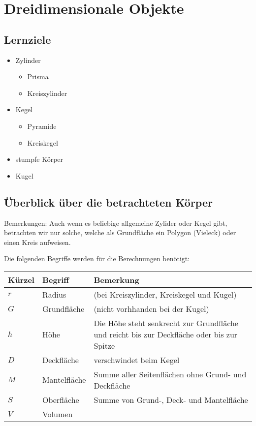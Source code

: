 \section{Dreidimensionale Objekte}


\subsection*{Lernziele}
\begin{itemize}
\item Zylinder
  \begin{itemize}
  \item Prisma
  \item Kreiszylinder
    \end{itemize}
\item Kegel
  \begin{itemize}
  \item Pyramide
  \item Kreiskegel
  \end{itemize}
  \item stumpfe Körper
  \item Kugel
\end{itemize}
\newpage
\subsection{Überblick über die betrachteten Körper}


Bemerkungen: Auch wenn es beliebige allgemeine Zylider oder Kegel
gibt, betrachten wir nur solche, welche als Grundfläche ein Polygon
(Vieleck) oder einen Kreis aufweisen.

Die folgenden Begriffe werden für die Berechnungen benötigt:

\begin{tabular}{|l|l|p{12cm}|}
  \hline
  Kürzel & Begriff& Bemerkung\\\hline
  $r$  & Radius & (bei Kreiszylinder, Kreiskegel und Kugel)\\\hline
  $G$  & Grundfläche & (nicht vorhhanden bei der Kugel)\\\hline
  $h$  & Höhe & Die Höhe steht senkrecht zur Grundfläche und reicht bis zur Deckfläche oder bis zur Spitze\\\hline
  $D$  & Deckfläche & verschwindet beim Kegel\\\hline
  $M$  & Mantelfläche & Summe aller Seitenflächen ohne Grund- und Deckfläche\\\hline
  $S$  & Oberfläche & Summe von Grund-, Deck- und Mantelfläche\\\hline
  $V$  & Volumen & \\\hline
  \end{tabular} 

